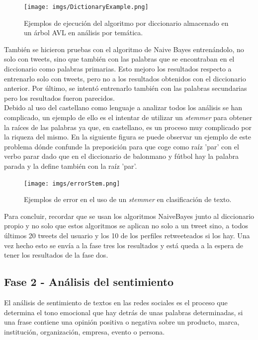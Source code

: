 \documentclass[../all.tex]{subfiles}
\begin{document}
	\begin{figure}[H]
		\centering
		\texttt{[image: imgs/DictionaryExample.png]}
		\caption{Ejemplos de ejecución del algoritmo por diccionario almacenado en un árbol AVL en análisis por temática.}
	\end{figure}

	\newpage
	También se hicieron pruebas con el algoritmo de Naive Bayes entrenándolo, no solo con tweets, sino que también con las palabras que se encontraban en el diccionario como palabras primarias. Esto mejoro los resultados respecto a entrenarlo solo con tweets, pero no a los resultados obtenidos con el diccionario anterior. Por último, se intentó entrenarlo también con las palabras secundarias pero los resultados fueron parecidos.\\
	
	Debido al uso del castellano como lenguaje a analizar todos los análisis se han complicado, un ejemplo de ello es el intentar de utilizar un \textit{stemmer} para obtener la raíces de las palabras ya que, en castellano, es un proceso muy complicado por la riqueza del mismo. En la siguiente figura se puede observar un ejemplo de este problema dónde confunde la preposición para que coge como raíz 'par' con el verbo parar dado que en el diccionario de balonmano y fútbol hay la palabra parada y la define también con la raíz 'par'.\\
	
	 \begin{figure}[H]
	 	\centering
	 	\texttt{[image: imgs/errorStem.png]}
	 	\caption{Ejemplos de error en el uso de un \textit{stemmer} en clasificación de texto.}
	 \end{figure}
	
	Para concluir, recordar que se usan los algoritmos NaiveBayes junto al diccionario propio y no solo que estos algoritmos se aplican no solo a un tweet sino, a todos últimos 20 tweets del usuario y los 10 de los perfiles retweeteados si los hay. Una vez hecho esto se envía a la fase tres los resultados y está queda a la espera de tener los resultados de la fase dos.
	
	
\newpage
\subsection{Fase 2 - Análisis del sentimiento}
    El análisis de sentimiento de textos en las redes sociales es el proceso que determina el tono emocional que hay detrás de unas palabras determinadas, si una frase contiene una opinión positiva o negativa sobre un producto, marca, institución, organización, empresa, evento o persona.\\
\end{document}
